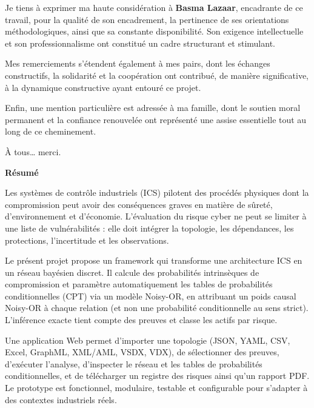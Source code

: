 \documentclass[12pt,a4paper]{article}
\newcommand{\unnumberedsection}[1]{%
  \phantomsection
  {\normalfont\Large\bfseries\sffamily\color{primary}#1\par}
  \vspace{-2pt}{\color{secondary!70}\rule{\linewidth}{0.8pt}}
  \vspace{1.6ex plus 0.2ex}%
}
\begin{document}
Je tiens à exprimer ma haute considération à \textbf{Basma Lazaar}, encadrante de ce travail, pour la qualité de son encadrement, la pertinence de ses orientations méthodologiques, ainsi que sa constante disponibilité. Son exigence intellectuelle et son professionnalisme ont constitué un cadre structurant et stimulant.

Mes remerciements s'étendent également à mes pairs, dont les échanges constructifs, la solidarité et la coopération ont contribué, de manière significative, à la dynamique constructive ayant entouré ce projet.

Enfin, une mention particulière est adressée à ma famille, dont le soutien moral permanent et la confiance renouvelée ont représenté une assise essentielle tout au long de ce cheminement.

\vspace{1cm}
\hfill À tous… merci.

\newpage
\thispagestyle{empty}
\unnumberedsection{Résumé}

\begin{abstractbox}
Les systèmes de contrôle industriels (ICS) pilotent des procédés physiques dont la compromission peut avoir des conséquences graves en matière de sûreté, d'environnement et d'économie. L'évaluation du risque cyber ne peut se limiter à une liste de vulnérabilités : elle doit intégrer la topologie, les dépendances, les protections, l'incertitude et les observations.

Le présent projet propose un framework qui transforme une architecture ICS en un réseau bayésien discret. Il calcule des probabilités intrinsèques de compromission et paramètre automatiquement les tables de probabilités conditionnelles (CPT) via un modèle Noisy-OR, en attribuant un poids causal Noisy-OR à chaque relation (et non une probabilité conditionnelle au sens strict). L'inférence exacte tient compte des preuves et classe les actifs par risque.

Une application Web permet d'importer une topologie (JSON, YAML, CSV, Excel, GraphML, XML/AML, VSDX, VDX), de sélectionner des preuves, d'exécuter l'analyse, d'inspecter le réseau et les tables de probabilités conditionnelles, et de télécharger un registre des risques ainsi qu'un rapport PDF. Le prototype est fonctionnel, modulaire, testable et configurable pour s'adapter à des contextes industriels réels.
\end{abstractbox}
\end{document}

